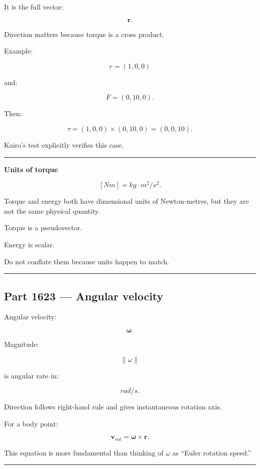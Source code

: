It is the full vector:

\[
\mathbf{r}.
\]

Direction matters because torque is a cross product.

Example:

\[
r=(1,0,0)
\]

and:

\[
F=(0,10,0).
\]

Then:

\[
\tau
=
(1,0,0)
\times
(0,10,0)
=
(0,0,10).
\]

Kairo's test explicitly verifies this case.

\begin{center}\rule{0.5\linewidth}{0.5pt}\end{center}

\textbf{Units of torque}

\[
[Nm]
=
kg\cdot m^2/s^2.
\]

Torque and energy both have dimensional units of Newton-metres, but they are not the same physical quantity.

Torque is a pseudovector.

Energy is scalar.

Do not conflate them because units happen to match.

\begin{center}\rule{0.5\linewidth}{0.5pt}\end{center}

\subsection{Part 1623 --- Angular velocity}\label{06-engine-ii-ch035-part-1623-angular-velocity}

Angular velocity:

\[
\boldsymbol{\omega}.
\]

Magnitude:

\[
\|\omega\|
\]

is angular rate in:

\[
rad/s.
\]

Direction follows right-hand rule and gives instantaneous rotation axis.

For a body point:

\[
\boxed{
\mathbf{v}_{rot}
=
\boldsymbol{\omega}\times\mathbf{r}.
}
\]

This equation is more fundamental than thinking of \(\omega\) as ``Euler rotation speed.''

\begin{center}\rule{0.5\linewidth}{0.5pt}\end{center}

